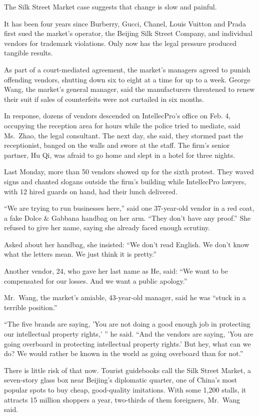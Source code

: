 \documentclass[12pt,a4paper,onecolumn]{article}
\begin{document}
\begin{CJK*}{GBK}{song}
The Silk Street Market case suggests that change is slow and painful.

It has been four years since Burberry, Gucci, Chanel, Louis Vuitton and Prada first sued the
market's operator, the Beijing Silk Street Company, and individual vendors for trademark violations.
Only now has the legal pressure produced tangible results.

As part of a court-mediated agreement, the market's managers agreed to punish offending vendors,
shutting down six to eight at a time for up to a week. George Wang, the market's general manager,
said the manufacturers threatened to renew their suit if sales of counterfeits were not curtailed in
six months.

In response, dozens of vendors descended on IntellecPro's office on Feb. 4, occupying the reception
area for hours while the police tried to mediate, said Ms.~Zhao, the legal consultant. The next day,
she said, they stormed past the receptionist, banged on the walls and swore at the staff. The firm's
senior partner, Hu Qi, was afraid to go home and slept in a hotel for three nights.

Last Monday, more than 50 vendors showed up for the sixth protest. They waved signs and chanted
slogans outside the firm's building while IntellecPro lawyers, with 12 hired guards on hand, had
their lunch delivered.

``We are trying to run businesses here,'' said one 37-year-old vendor in a red coat, a fake Dolce \&
Gabbana handbag on her arm. ``They don't have any proof.'' She refused to give her name, saying she
already faced enough scrutiny.

Asked about her handbag, she insisted: ``We don't read English. We don't know what the letters mean.
We just think it is pretty.''

Another vendor, 24, who gave her last name as He, said: ``We want to be compensated for our losses.
And we want a public apology.''

Mr.~Wang, the market's amiable, 43-year-old manager, said he was ``stuck in a terrible position.''

``The five brands are saying, 'You are not doing a good enough job in protecting our intellectual
property rights,' '' he said. ``And the vendors are saying, 'You are going overboard in protecting
intellectual property rights.' But hey, what can we do? We would rather be known in the world as
going overboard than for not.''

There is little risk of that now. Tourist guidebooks call the Silk Street Market, a seven-story
glass box near Beijing's diplomatic quarter, one of China's most popular spots to buy cheap,
good-quality imitations. With some 1,200 stalls, it attracts 15 million shoppers a year, two-thirds
of them foreigners, Mr.~Wang said.


\end{CJK*}
\end{document}
